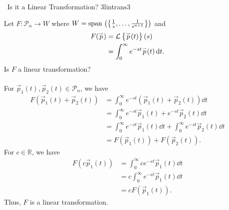         \begin{example}{\Difficulty\,\Difficulty\,\,Is it a Linear Transformation? 3}{lintrans3}

            Let \(F:\mathcal{P}_{n}\to W\) where \(W=\text{span\,}\left(\left\{\frac{1}{s},\ldots,\frac{1}{s^{n+1}}\right\}\right)\) and
            \begin{align*}
                F(\overset{_{\rightharpoonup}}{p})&=\mathcal{L}^{}\left\{\overset{_{\rightharpoonup}}{p}(t)\right\}(s) \\
                &=\int_0^\infty e^{-st}\overset{_{\rightharpoonup}}{p}(t)\,\text{d} t.
            \end{align*}
            Is \(F\) a linear transformation?
            \\
            \\
            For \(\vec{p}_1(t),\vec{p}_2(t)\in\mathcal{P}_n\), we have
            \begin{align*}
                F(\vec{p}_1(t)+\vec{p}_2(t))&=\int_0^\infty e^{-st}(\vec{p}_1(t)+\vec{p}_2(t))\dd t \\
                &=\int_0^\infty e^{-st}\vec{p}_1(t)+e^{-st}\vec{p}_2(t)\dd t \\
                &=\int_0^\infty e^{-st}\vec{p}_1(t)\dd t+\int_0^\infty e^{-st}\vec{p}_2(t)\dd t \\
                &=F(\vec{p}_1(t))+F(\vec{p}_2(t)).
            \end{align*}
            For \(c\in\mathbb{R}\), we have 
            \begin{align*}
                F(c\vec{p}_1(t))&=\int_0^\infty ce^{-st}\vec{p}_1(t)\dd t \\
                &=c\int_0^\infty e^{-st}\vec{p}_1(t)\dd t \\
                &=cF(\vec{p}_1(t)).
            \end{align*}
            Thus, \(F\) is a linear transformation.
        \end{example}
        \pagebreak
